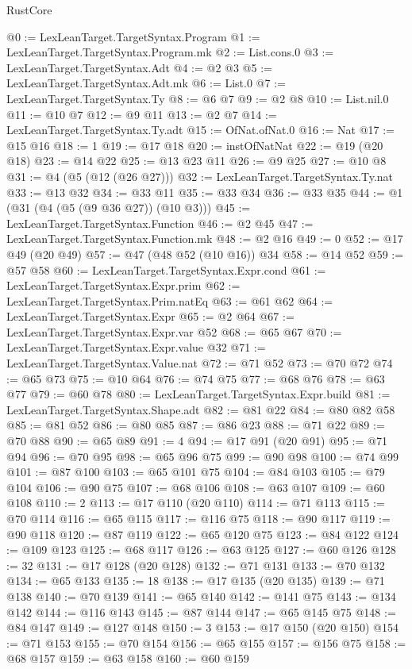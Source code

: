 \begin{lexlean}{RustCore}
\begin{coremodule}
@0 := LexLeanTarget.TargetSyntax.Program
@1 := LexLeanTarget.TargetSyntax.Program.mk
@2 := List.cons.{0}
@3 := LexLeanTarget.TargetSyntax.Adt
@4 := @2 @3
@5 := LexLeanTarget.TargetSyntax.Adt.mk
@6 := List.{0}
@7 := LexLeanTarget.TargetSyntax.Ty
@8 := @6 @7
@9 := @2 @8
@10 := List.nil.{0}
@11 := @10 @7
@12 := @9 @11
@13 := @2 @7
@14 := LexLeanTarget.TargetSyntax.Ty.adt
@15 := OfNat.ofNat.{0}
@16 := Nat
@17 := @15 @16
@18 := 1
@19 := @17 @18
@20 := instOfNatNat
@22 := @19 (@20 @18)
@23 := @14 @22
@25 := @13 @23 @11
@26 := @9 @25
@27 := @10 @8
@31 := @4 (@5 (@12 (@26 @27)))
@32 := LexLeanTarget.TargetSyntax.Ty.nat
@33 := @13 @32
@34 := @33 @11
@35 := @33 @34
@36 := @33 @35
@44 := @1 (@31 (@4 (@5 (@9 @36 @27)) (@10 @3)))
@45 := LexLeanTarget.TargetSyntax.Function
@46 := @2 @45
@47 := LexLeanTarget.TargetSyntax.Function.mk
@48 := @2 @16
@49 := 0
@52 := @17 @49 (@20 @49)
@57 := @47 (@48 @52 (@10 @16)) @34
@58 := @14 @52
@59 := @57 @58
@60 := LexLeanTarget.TargetSyntax.Expr.cond
@61 := LexLeanTarget.TargetSyntax.Expr.prim
@62 := LexLeanTarget.TargetSyntax.Prim.natEq
@63 := @61 @62
@64 := LexLeanTarget.TargetSyntax.Expr
@65 := @2 @64
@67 := LexLeanTarget.TargetSyntax.Expr.var @52
@68 := @65 @67
@70 := LexLeanTarget.TargetSyntax.Expr.value @32
@71 := LexLeanTarget.TargetSyntax.Value.nat
@72 := @71 @52
@73 := @70 @72
@74 := @65 @73
@75 := @10 @64
@76 := @74 @75
@77 := @68 @76
@78 := @63 @77
@79 := @60 @78
@80 := LexLeanTarget.TargetSyntax.Expr.build
@81 := LexLeanTarget.TargetSyntax.Shape.adt
@82 := @81 @22
@84 := @80 @82 @58
@85 := @81 @52
@86 := @80 @85
@87 := @86 @23
@88 := @71 @22
@89 := @70 @88
@90 := @65 @89
@91 := 4
@94 := @17 @91 (@20 @91)
@95 := @71 @94
@96 := @70 @95
@98 := @65 @96 @75
@99 := @90 @98
@100 := @74 @99
@101 := @87 @100
@103 := @65 @101 @75
@104 := @84 @103
@105 := @79 @104
@106 := @90 @75
@107 := @68 @106
@108 := @63 @107
@109 := @60 @108
@110 := 2
@113 := @17 @110 (@20 @110)
@114 := @71 @113
@115 := @70 @114
@116 := @65 @115
@117 := @116 @75
@118 := @90 @117
@119 := @90 @118
@120 := @87 @119
@122 := @65 @120 @75
@123 := @84 @122
@124 := @109 @123
@125 := @68 @117
@126 := @63 @125
@127 := @60 @126
@128 := 32
@131 := @17 @128 (@20 @128)
@132 := @71 @131
@133 := @70 @132
@134 := @65 @133
@135 := 18
@138 := @17 @135 (@20 @135)
@139 := @71 @138
@140 := @70 @139
@141 := @65 @140
@142 := @141 @75
@143 := @134 @142
@144 := @116 @143
@145 := @87 @144
@147 := @65 @145 @75
@148 := @84 @147
@149 := @127 @148
@150 := 3
@153 := @17 @150 (@20 @150)
@154 := @71 @153
@155 := @70 @154
@156 := @65 @155
@157 := @156 @75
@158 := @68 @157
@159 := @63 @158
@160 := @60 @159

\end{coremodule}
\end{lexlean}
